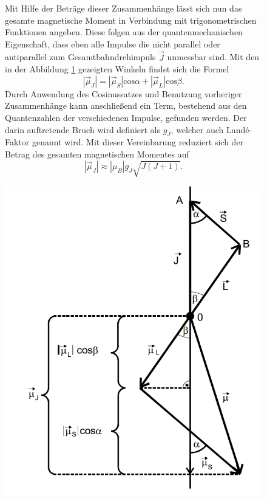 \begin{figure}
\begin{minipage}[b]{0.5\textwidth}
Mit Hilfe der Beträge dieser Zusammenhänge lässt sich nun das gesamte magnetische Moment in Verbindung mit trigonometrischen Funktionen angeben.
Diese folgen aus der quantenmechanischen Eigenschaft, dass eben alle Impulse die nicht parallel oder antiparallel zum Gesamtbahndrehimpuls $\vec{J}$
unmessbar sind. Mit den in der Abbildung \ref{fig:winkel} gezeigten Winkeln findet sich die Formel
\begin{equation*}
    |\vec{\mu}_J| =  |\vec{\mu}_S|\text{cos}\alpha + |\vec{\mu}_L| \text{cos}\beta.
\end{equation*}
Durch Anwendung des Cosinussatzes und Benutzung vorheriger Zusammenhänge kann anschließend ein Term, bestehend aus den Quantenzahlen
der verschiedenen Impulse, gefunden werden. Der darin auftretende Bruch wird definiert als $g_J$, welcher auch Landé-Faktor genannt wird.
Mit dieser Vereinbarung reduziert sich der Betrag des gesamten magnetischen Momentes auf
\begin{equation}
    \label{eqn:idkobdasüberhaubtsstimmtlol}
    |\vec{\mu}_J| \approx |\mu_B| g_J \sqrt{J(J+1)}.
\end{equation}
\end{minipage}
\hfill
\begin{minipage}[b]{0.45\textwidth}
    \centering
    \includegraphics[width=\textwidth]{bilder/winkel.png}
    \captionsetup{justification=centering}
    \label{fig:winkel}
\end{minipage}
\end{figure}

